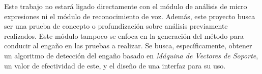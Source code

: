 Este trabajo no estará ligado directamente con el módulo de análisis de micro expresiones ni el módulo de reconocimiento de voz. Además, este proyecto busca ser una prueba de concepto o profundización sobre análisis previamente realizados. Este módulo tampoco se enfoca en la generación del método para conducir al engaño en las pruebas a realizar. Se busca, específicamente, obtener un algoritmo de detección del engaño basado en \textit{Máquina de Vectores de Soporte}, un valor de efectividad de este, y el diseño de una interfaz para su uso.   